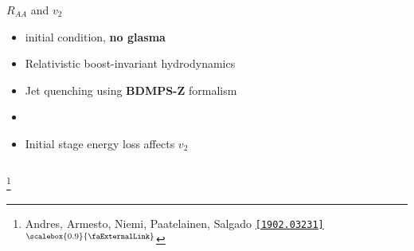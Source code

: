 \documentclass[aspectratio=169,11pt,usenames,dvipsnames]{beamer}
\renewcommand{\thefootnote}{\color{customblue}\faPaperPlaneO}
\newcommand\blfootnote[1]{%
  \begingroup
  \renewcommand\thefootnote{}\footnote{#1}%
  \addtocounter{footnote}{-1}%
  \endgroup
}
\begin{document}
\begin{frame}[t,noframenumbering]
\begin{columns}[onlytextwidth,t]
\begin{center}
            {\Large\color{palgold} $R_{AA}$ and $v_2$  \\[10pt]}
            \footnotesize
                \begin{itemize}
                    \item {\color{lightgray}{\bfseries EKRT} initial condition, {\bfseries no glasma}}
                    \item {\color{lightgray}Relativistic boost-invariant hydrodynamics}
                    \item {\color{lightgray}Jet quenching using {\bfseries BDMPS-Z} formalism}
                    \item {}
                    \item {\color{lightgray}Initial stage energy loss affects $v_2$}
                \end{itemize}
        \end{center}
    \end{columns}
    \blfootnote{\scriptsize Andres, Armesto, Niemi, Paatelainen, Salgado \href{https://arxiv.org/abs/1902.03231}{\color{palgold}\texttt{[1902.03231]}$^\text{\scalebox{0.9}{\faExternalLink}}$}}
\end{frame}

\end{document}

